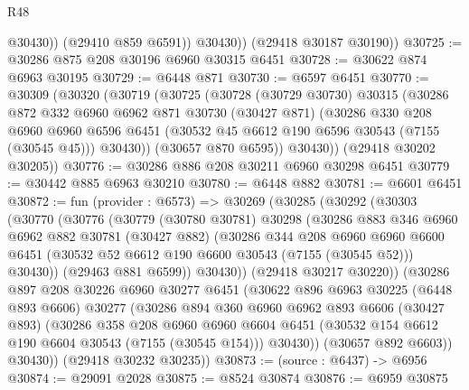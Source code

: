 \begin{lexlean}{R48}
\begin{coremodule}
                @30430))
            (@29410 @859 @6591))
          @30430))
      (@29418 @30187 @30190))
@30725 := @30286 @875 @208 @30196 @6960 @30315 @6451
@30728 := @30622 @874 @6963 @30195
@30729 := @6448 @871
@30730 := @6597 @6451
@30770 := @30309
    (@30320
      (@30719
        (@30725
          (@30728
            (@30729 @30730)
            @30315
            (@30286
              @872
              @332
              @6960
              @6962
              @871
              @30730
              (@30427 @871)
              (@30286
                @330
                @208
                @6960
                @6960
                @6596
                @6451
                (@30532 @45 @6612 @190 @6596 @30543 (@7155 (@30545 @45)))
                @30430))
            (@30657 @870 @6595))
          @30430))
      (@29418 @30202 @30205))
@30776 := @30286 @886 @208 @30211 @6960 @30298 @6451
@30779 := @30442 @885 @6963 @30210
@30780 := @6448 @882
@30781 := @6601 @6451
@30872 := fun (provider : @6573) =>
  @30269
    (@30285
      (@30292
        (@30303
          (@30770
            (@30776
              (@30779
                (@30780 @30781)
                @30298
                (@30286
                  @883
                  @346
                  @6960
                  @6962
                  @882
                  @30781
                  (@30427 @882)
                  (@30286
                    @344
                    @208
                    @6960
                    @6960
                    @6600
                    @6451
                    (@30532 @52 @6612 @190 @6600 @30543 (@7155 (@30545 @52)))
                    @30430))
                (@29463 @881 @6599))
              @30430))
          (@29418 @30217 @30220))
        (@30286
          @897
          @208
          @30226
          @6960
          @30277
          @6451
          (@30622
            @896
            @6963
            @30225
            (@6448 @893 @6606)
            @30277
            (@30286
              @894
              @360
              @6960
              @6962
              @893
              @6606
              (@30427 @893)
              (@30286
                @358
                @208
                @6960
                @6960
                @6604
                @6451
                (@30532 @154 @6612 @190 @6604 @30543 (@7155 (@30545 @154)))
                @30430))
            (@30657 @892 @6603))
          @30430))
      (@29418 @30232 @30235))
@30873 := (source : @6437) -> @6956
@30874 := @29091 @2028
@30875 := @8524 @30874
@30876 := @6959 @30875

\end{coremodule}
\end{lexlean}
